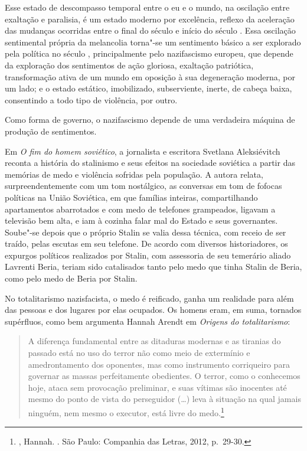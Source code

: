 Esse estado de descompasso temporal entre o eu e o mundo, na oscilação
entre exaltação e paralisia, é um estado moderno por excelência,
reflexo da aceleração das
mudanças ocorridas entre o final do século  e início do século .
Essa oscilação sentimental própria da melancolia torna"-se um sentimento
básico a ser explorado pela política no século , principalmente pelo
nazifascismo europeu, que depende da exploração dos sentimentos de ação
gloriosa, exaltação patriótica, transformação ativa de um mundo em
oposição à sua degeneração moderna, por um lado; e o estado estático,
imobilizado, subserviente, inerte, de cabeça baixa, consentindo a todo
tipo de violência, por outro.

Como forma de governo, o nazifascismo depende de uma verdadeira máquina
de produção de sentimentos.

\asterisc

Em \emph{O fim do homem soviético}, a jornalista e escritora Svetlana
Aleksiévitch reconta a história do stalinismo e seus efeitos na sociedade
soviética a partir das memórias de medo e violência sofridas pela
população. A autora relata, surpreendentemente com um tom nostálgico, as
conversas em tom de fofocas políticas na União Soviética, em que
famílias inteiras, compartilhando apartamentos abarrotados e com medo de
telefones grampeados, ligavam a televisão bem alta, e iam à cozinha
falar mal do Estado e seus governantes. Soube"-se depois que o próprio Stalin se valia dessa
técnica, com receio de ser traído, pelas escutas em seu telefone. De
acordo com diversos historiadores, os expurgos políticos realizados por
Stalin, com assessoria de seu temerário aliado Lavrenti Beria, teriam
sido catalisados tanto pelo medo que tinha Stalin de Beria, como pelo
medo de Beria por Stalin.

No totalitarismo nazisfacista, o medo é reificado, ganha um realidade
para além das pessoas e dos lugares por elas ocupados. Os homens eram,
em suma, tornados supérfluos, como bem argumenta Hannah Arendt em
\emph{Origens do totalitarismo}:

\begin{quote}
A diferença fundamental entre as ditaduras modernas e as tiranias do
passado está no uso do terror não como meio de extermínio e
amedrontamento dos oponentes, mas como instrumento corriqueiro para
governar as massas perfeitamente obedientes. O terror, como o conhecemos
hoje, ataca sem provocação preliminar, e suas vítimas são inocentes até
mesmo do ponto de vista do perseguidor (\ldots{}) leva à situação na qual
jamais ninguém, nem mesmo o executor, está livre do medo.\footnote{,
  Hannah. {}. São Paulo: Companhia das Letras, 2012, p.~29-30.}
\end{quote}

